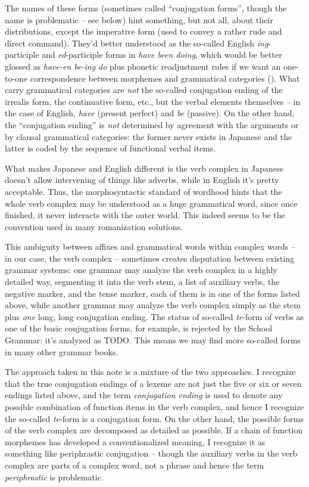\documentclass[UTF8, a4paper, oneside, scheme=plain]{ctexart}
\newcommand*{\term}[1]{\emph{#1}}
\newcommand{\corpus}[1]{\emph{#1}}
\begin{document}
The names of these forms (sometimes called ``conjugation forms'', though the name is problematic -- see below) 
hint something, but not all, about their distributions,
except the imperative form (used to convey a rather rude and direct command).
They'd better understood as the 
so-called English \corpus{ing}-participle and \corpus{ed}-participle forms 
in \corpus{have been doing},
which would be better glossed as 
\corpus{have-en be-ing do} plus phonetic readjustment rules
if we want an one-to-one correspondence between morphemes and grammatical categories 
().
What carry grammatical categories are \emph{not} the so-called conjugation ending of 
the irrealis form, the continuative form, etc.,
but the verbal elements themselves -- 
in the case of English,
\corpus{have} (present perfect) and \corpus{be} (passive).
On the other hand, the ``conjugation ending'' 
is \emph{not} determined by agreement with the arguments 
or by clausal grammatical categories:
the former never exists in Japanese and the latter is coded by the sequence of functional verbal items.

What makes Japanese and English different 
is the verb complex in Japanese doesn't allow intervening of things like adverbs,
while in English it's pretty acceptable.
Thus, the morphosyntactic standard of wordhood hints that 
the whole verb complex may be understood as a huge grammatical word,
since once finished, it never interacts with the outer world.
This indeed seems to be the convention used in many romanization solutions.

This ambiguity between affixes and grammatical words within complex words 
-- in our case, the verb complex -- 
sometimes creates
disputation between existing grammar systems:
one grammar may analyze the verb complex in a highly detailed way,
segmenting it into the verb stem, a list of auxiliary verbs, the negative marker, and the tense marker,
each of them is in one of the forms listed above,
while another grammar may analyze the verb complex 
simply as the stem plus \emph{one} long, long conjugation ending.
The status of so-called \corpus{te}-form of verbs as one of the basic conjugation forms, for example,
is rejected by the School Grammar:
it's analyzed as TODO.
This means we may find more so-called forms in many other grammar books.

The approach taken in this note is a mixture of the two approaches.
I recognize that the true conjugation endings of a lexeme 
are not just the five or six or seven endings listed above,
and the term \corpus{conjugation ending} is used to denote 
any possible combination of function items in the verb complex,
and hence I recognize the so-called \corpus{te}-form is a conjugation form.
On the other hand,
the possible forms of the verb complex are decomposed as detailed as possible.
If a chain of function morphemes has developed a conventionalized meaning,
I recognize it as something like periphrastic conjugation -- 
though the auxiliary verbs in the verb complex are parts of a complex word,
not a phrase and hence the term \term{periphrastic} is problematic.
\end{document}
